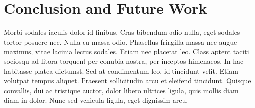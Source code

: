 \documentclass[sigconf,review,anonymous]{acmart}
\begin{document}
\section{Conclusion and Future Work}

Morbi sodales iaculis dolor id finibus. Cras bibendum odio nulla, eget sodales tortor posuere nec. Nulla eu massa odio. Phasellus fringilla massa nec augue maximus, vitae lacinia lectus sodales. Etiam nec placerat leo. Class aptent taciti sociosqu ad litora torquent per conubia nostra, per inceptos himenaeos. In hac habitasse platea dictumst. Sed at condimentum leo, id tincidunt velit. Etiam volutpat tempus aliquet. Praesent sollicitudin arcu et eleifend tincidunt. Quisque convallis, dui ac tristique auctor, dolor libero ultrices ligula, quis mollis diam diam in dolor. Nunc sed vehicula ligula, eget dignissim arcu.


 
\end{document}
